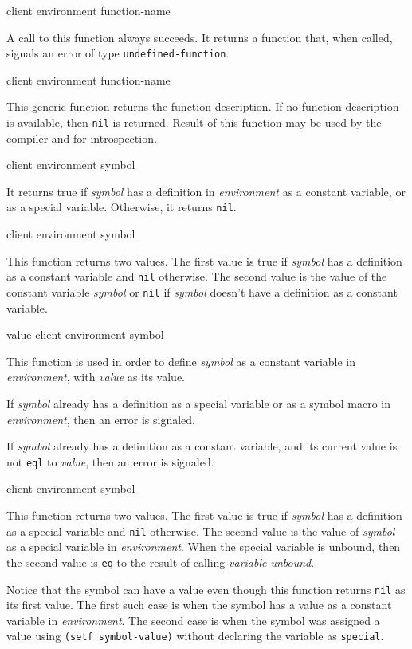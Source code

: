  {client environment function-name}

A call to this function always succeeds.  It returns a function that, when
called, signals an error of type \texttt{undefined-function}.

 {client environment function-name}

This generic function returns the function description. If no function
description is available, then \texttt{nil} is returned. Result of this
function may be used by the compiler and for introspection.

 {client environment symbol}

It returns true if \textit{symbol} has a definition in \textit{environment} as
a constant variable, or as a special variable. Otherwise, it returns
\texttt{nil}.

 {client environment symbol}

This function returns two values. The first value is true if \textit{symbol}
has a definition as a constant variable and \texttt{nil} otherwise. The second
value is the value of the constant variable \textit{symbol} or \texttt{nil} if
\textit{symbol} doesn't have a definition as a constant variable.

 {value client environment symbol}

This function is used in order to define \textit{symbol} as a constant
variable in \textit{environment}, with \textit{value} as its value.

If \textit{symbol} already has a definition as a special variable or
as a symbol macro in \textit{environment}, then an error is signaled.

If \textit{symbol} already has a definition as a constant variable,
and its current value is not \texttt{eql} to \textit{value}, then an
error is signaled.

 {client environment symbol}

This function returns two values. The first value is true if \textit{symbol}
has a definition as a special variable and \texttt{nil} otherwise. The second
value is the value of \textit{symbol} as a special variable in
\textit{environment}. When the special variable is unbound, then the second
value is \texttt{eq} to the result of calling \textit{variable-unbound}.

Notice that the symbol can have a value even though this function returns
\texttt{nil} as its first value.  The first such case is when the symbol has a
value as a constant variable in \textit{environment}.  The second case is when
the symbol was assigned a value using \texttt{(setf symbol-value)} without
declaring the variable as \texttt{special}.

